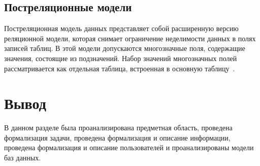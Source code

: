 \subsection{Постреляционные модели}
Постреляционная модель данных представляет собой расширенную версию реляционной модели, которая снимает ограничение неделимости данных в полях записей таблиц.
В этой модели допускаются многозначные поля, содержащие значения, состоящие из подзначений. Набор значений многозначных полей рассматривается как отдельная таблица, встроенная в основную таблицу~\cite{voroneg}.
 
\section*{Вывод}
В данном разделе была проанализирована предметная область, проведена формализация задачи, проведена формализация и описание информации, проведена формализация и описание пользователей и проанализированы модели баз данных. 
